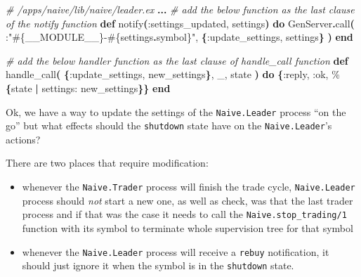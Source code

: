 \documentclass[
  oneside]{book}
\newenvironment{Shaded}{\begin{snugshade}}{\end{snugshade}}
\newcommand{\CommentTok}[1]{\textcolor[rgb]{0.56,0.35,0.01}{\textit{#1}}}
\newcommand{\ConstantTok}[1]{\textcolor[rgb]{0.56,0.35,0.01}{#1}}
\newcommand{\FunctionTok}[1]{\textcolor[rgb]{0.13,0.29,0.53}{\textbf{#1}}}
\newcommand{\KeywordTok}[1]{\textcolor[rgb]{0.13,0.29,0.53}{\textbf{#1}}}
\newcommand{\NormalTok}[1]{#1}
\newcommand{\OperatorTok}[1]{\textcolor[rgb]{0.81,0.36,0.00}{\textbf{#1}}}
\newcommand{\OtherTok}[1]{\textcolor[rgb]{0.56,0.35,0.01}{#1}}
\newcommand{\StringTok}[1]{\textcolor[rgb]{0.31,0.60,0.02}{#1}}
\newcommand{\VariableTok}[1]{\textcolor[rgb]{0.00,0.00,0.00}{#1}}
\providecommand{\tightlist}{%
  \setlength{\itemsep}{0pt}\setlength{\parskip}{0pt}}
\begin{document}
\begin{Shaded}
\begin{Highlighting}[]
\CommentTok{\# /apps/naive/lib/naive/leader.ex}
  \OperatorTok{...}
  \CommentTok{\# add the below function as the last clause of the \textasciigrave{}notify\textasciigrave{} function}
  \KeywordTok{def}\NormalTok{ notify}\FunctionTok{(}\VariableTok{:settings\_updated}\NormalTok{, settings}\FunctionTok{)} \KeywordTok{do}
    \ConstantTok{GenServer}\OperatorTok{.}\NormalTok{call}\FunctionTok{(}
\NormalTok{      :}\StringTok{"}\OtherTok{\#\{}\ConstantTok{\_\_MODULE\_\_}\OtherTok{\}}\StringTok{{-}}\OtherTok{\#\{}\NormalTok{settings}\OperatorTok{.}\NormalTok{symbol}\OtherTok{\}}\StringTok{"}\NormalTok{,}
      \FunctionTok{\{}\VariableTok{:update\_settings}\NormalTok{, settings}\FunctionTok{\}}
    \FunctionTok{)}
  \KeywordTok{end}

  \CommentTok{\# add the below handler function as the last clause of \textasciigrave{}handle\_call\textasciigrave{} function}
  \KeywordTok{def}\NormalTok{ handle\_call}\FunctionTok{(}
        \FunctionTok{\{}\VariableTok{:update\_settings}\NormalTok{, new\_settings}\FunctionTok{\}}\NormalTok{,}
\NormalTok{        \_,}
\NormalTok{        state}
      \FunctionTok{)} \KeywordTok{do}
    \FunctionTok{\{}\VariableTok{:reply}\NormalTok{, }\VariableTok{:ok}\NormalTok{, \%}\FunctionTok{\{}\NormalTok{state }\OperatorTok{|} \VariableTok{settings:}\NormalTok{ new\_settings}\FunctionTok{\}\}}
  \KeywordTok{end}
\end{Highlighting}
\end{Shaded}

Ok, we have a way to update the settings of the \texttt{Naive.Leader} process ``on the go'' but what effects should the \texttt{shutdown} state have on the \texttt{Naive.Leader}'s actions?

There are two places that require modification:

\begin{itemize}
\tightlist
\item
  whenever the \texttt{Naive.Trader} process will finish the trade cycle, \texttt{Naive.Leader} process should \emph{not} start a new one, as well as check, was that the last trader process and if that was the case it needs to call the \texttt{Naive.stop\_trading/1} function with its symbol to terminate whole supervision tree for that symbol
\item
  whenever the \texttt{Naive.Leader} process will receive a \texttt{rebuy} notification, it should just ignore it when the symbol is in the \texttt{shutdown} state.
\end{itemize}
\end{document}
